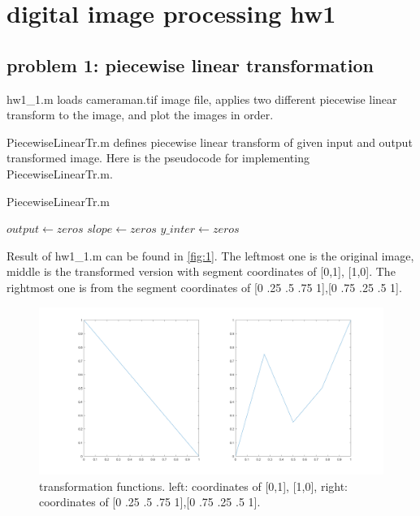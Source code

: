\documentclass{bmvc2k}
\begin{document}
\section*{digital image processing hw1}
\subsection*{problem 1: piecewise linear transformation}

hw1\_1.m loads cameraman.tif image file, applies two different piecewise 
linear transform to the image, and plot the images in order.

PiecewiseLinearTr.m defines piecewise linear transform of given input and 
output transformed image.
Here is the pseudocode for implementing PiecewiseLinearTr.m.

\begin{algorithm}
\caption{PiecewiseLinearTr.m}
$output \gets zeros$\;
$slope \gets zeros$\;
$y\_inter \gets zeros$\;

\end{algorithm}

Result of hw1\_1.m can be found in \figurename{\ref{fig:1}}. The leftmost one is the original image, 
middle is the transformed version with segment coordinates of [0,1], [1,0]. The rightmost one is from the
segment coordinates of [0 .25 .5 .75 1],[0 .75 .25 .5 1].

\begin{figure}[h]
    \centering
    \includegraphics[scale=0.25]{hw1_1_2}
    \caption{transformation functions. 
    left: coordinates of [0,1], [1,0], right: coordinates of [0 .25 .5 .75 1],[0 .75 .25 .5 1].}
    \label{fig:2}
\end{figure}
\end{document}
